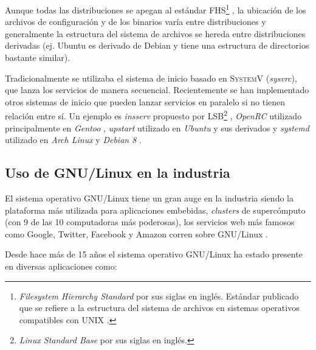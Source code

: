 Aunque todas las distribuciones se apegan al est\'{a}ndar \textsc{\gls{FHS}}\footnote{\textit{Filesystem Hierarchy Standard} por sus siglas en ingl\'{e}s. Est\'{a}ndar publicado que se refiere a la estructura del sistema de archivos en sistemas operativos compatibles con \textsc{UNIX} \cite{_fhs_????}.} \cite{_filesystem_????}, la ubicaci\'{o}n de los archivos de configuraci\'{o}n y de los binarios var\'{i}a entre distribuciones y generalmente la estructura del sistema de archivos se hereda entre distribuciones derivadas (ej. Ubuntu es derivado de Debian y tiene una estructura de directorios bastante similar).

Tradicionalmente se utilizaba el sistema de inicio basado en \textsc{SystemV} (\textit{sysvrc}), que lanza los servicios de manera secuencial. Recientemente se han implementado otros sistemas de inicio que pueden lanzar servicios en paralelo si no tienen relaci\'{o}n entre s\'{i}. Un ejemplo es \textit{insserv} propuesto por \textsc{\gls{LSB}}\footnote{\textit{Linux Standard Base} por sus siglas en ingl\'{e}s.} \cite{_lsbinitscripts_????} \cite{_lsbinitscripts/dependencybasedboot_????}, \textit{OpenRC} utilizado principalmente en \textit{Gentoo} \cite{_gentoo_????}\cite{_openrc_????}\cite{_openrc_????-1}, \textit{upstart} utilizado en \textit{Ubuntu} y sus derivados \cite{_upstart_????} y \textit{systemd} utilizado en \textit{Arch Linux} y \textit{Debian 8} \cite{_systemd_????}.


  \subsection {Uso de GNU/Linux en la industria}

El sistema operativo GNU/Linux tiene un gran auge en la industria siendo la plataforma m\'{a}s utilizada para aplicaciones embebidas, \textit{clusters} de superc\'{o}mputo (con 9 de las 10 computadoras m\'{a}s poderosas), los servicios web m\'{a}s famosos como Google, Twitter, Facebook y Amazon corren sobre GNU/Linux \cite{_how_????}.
\newpage

Desde hace m\'{a}s de 15 a\~{n}os el sistema operativo \textsc{GNU}/Linux ha estado presente en diversas aplicaciones como:

